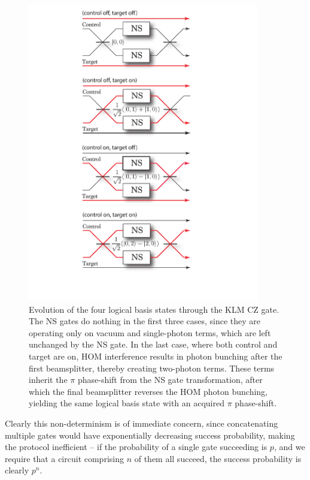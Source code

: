 \begin{figure}[htpb]
\includegraphics[width=0.9\textwidth]{KLM_optical_paths}
\caption{Evolution of the four logical basis states through the KLM CZ gate. The NS gates do nothing in the first three cases, since they are operating only on vacuum and single-photon terms, which are left unchanged by the NS gate. In the last case, where both control and target are on, HOM interference results in photon bunching after the first beamsplitter, thereby creating two-photon terms. These terms inherit the $\pi$ phase-shift from the NS gate transformation, after which the final beamsplitter reverses the HOM photon bunching, yielding the same logical basis state with an acquired $\pi$ phase-shift.} \label{fig:KLM_explain} 
\end{figure}

Clearly this non-determinism is of immediate concern, since concatenating multiple gates would have exponentially decreasing success probability, making the protocol inefficient -- if the probability of a single gate succeeding is $p$, and we require that a circuit comprising $n$ of them all succeed, the success probability is clearly $p^n$.

